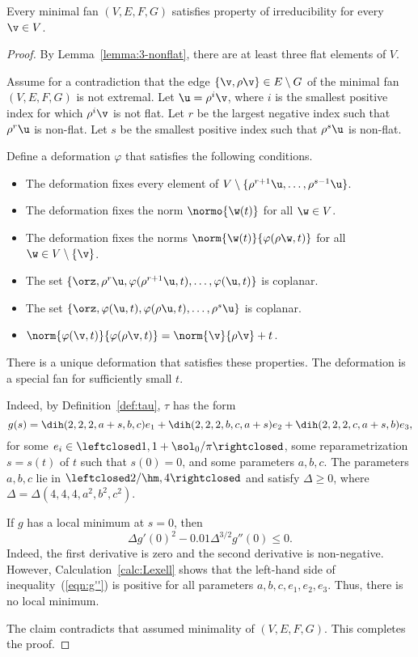 \begin{lemma}
Every minimal fan $(V,E,F,G)$ satisfies property 
of irreducibility for every $\v\in V$.
\end{lemma}

\begin{proof} 
By Lemma~\ref{lemma:3-nonflat}, there are at least three flat
elements of $V$.

Assume for a contradiction that the edge $\{\v,\rho\v\}\in
E\setminus G$ of the minimal fan $(V,E,F,G)$ is not extremal.  Let
$\u = \rho^i\v$, where $i$ is the smallest positive index for which
$\rho^i\v$ is not flat.  Let $r$ be the largest negative index such
that $\rho^r\u$ is non-flat.  Let $s$ be the smallest positive index
such that $\rho^s\u$ is non-flat.

Define a deformation $\varphi$ that satisfies the following conditions.
\begin{itemize}
\item The deformation fixes every element of
$V\setminus\{\rho^{r+1}\u,\ldots,\rho^{s-1}\u\}$.
\item The deformation  fixes the norm $\normo{\w(t)}$ for all $\w\in V$.  
\item The deformation fixes the norms $\norm{\w(t)}{\varphi(\rho
\w,t)}$ for all $\w\in V\setminus\{\v\}$.
\item The set
$\{\orz,\rho^r\u,\varphi(\rho^{r+1}\u,t),\ldots,\varphi(\u,t)\}$ is
coplanar.
\item The set
$\{\orz,\varphi(\u,t),\varphi(\rho\u,t),\ldots,\rho^s\u\}$ is
coplanar.
\item $\norm{\varphi(\v,t)}{\varphi(\rho\v,t)} = \norm{\v}{\rho\v}+t$.
\end{itemize}
There is a unique deformation that satisfies these properties.  The
deformation is a special fan for sufficiently small $t$.

  Indeed, by Definition~\ref{def:tau},
$\tau$ has the form
\begin{displaymath}
  g(s) = \dih(2,2,2,a+s,b,c) e_1 
+ \dih(2,2,2,b,c,a+s) e_2 + \dih(2,2,2,c,a+s,b) e_3,
\end{displaymath}
for some $e_i\in\leftclosed1,1+\sol_0/\pi\rightclosed$, some
reparametrization $s=s(t)$ of $t$ such that $s(0)=0$, and some
parameters $a,b,c$.  The parameters $a,b,c$ lie in
$\leftclosed2/\hm,4\rightclosed$ and satisfy $\Delta\ge0$, where
$\Delta = \Delta(4,4,4,a^2,b^2,c^2)$.

If $g$ has a local minimum at $s=0$, then
\begin{equation}\label{eqn:g''}
\Delta g'(0)^2 - 0.01\Delta^{3/2} g''(0) \le 0.
\end{equation}
Indeed, the first derivative is zero and the second derivative is
non-negative.  However, Calculation~\ref{calc:Lexell} shows that the
left-hand side of inequality~(\ref{eqn:g''}) is positive for all
parameters $a,b,c,e_1,e_2,e_3$.  Thus, there is no local minimum.

The claim contradicts that assumed minimality of $(V,E,F,G)$.  This
completes the proof.
\end{proof}


